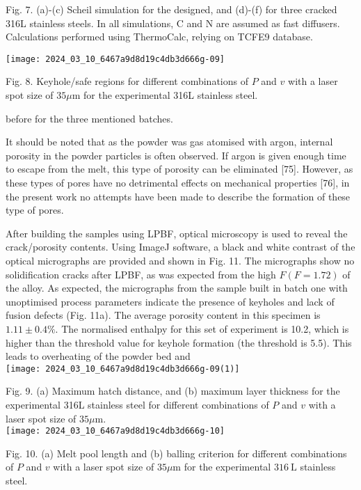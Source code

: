 \documentclass[10pt]{article}
\begin{document}
Fig. 7. (a)-(c) Scheil simulation for the designed, and (d)-(f) for three cracked 316L stainless steels. In all simulations, C and N are assumed as fast diffusers. Calculations performed using ThermoCalc, relying on TCFE9 database.

\begin{center}
\texttt{[image: 2024\_03\_10\_6467a9d8d19c4db3d666g-09]}
\end{center}

Fig. 8. Keyhole/safe regions for different combinations of $P$ and $v$ with a laser spot size of $35 \mu \mathrm{m}$ for the experimental 316L stainless steel.

before for the three mentioned batches.

It should be noted that as the powder was gas atomised with argon, internal porosity in the powder particles is often observed. If argon is given enough time to escape from the melt, this type of porosity can be eliminated [75]. However, as these types of pores have no detrimental effects on mechanical properties [76], in the present work no attempts have been made to describe the formation of these type of pores.

After building the samples using LPBF, optical microscopy is used to reveal the crack/porosity contents. Using ImageJ software, a black and white contrast of the optical micrographs are provided and shown in Fig. 11. The micrographs show no solidification cracks after LPBF, as was expected from the high $F(F=1.72)$ of the alloy. As expected, the micrographs from the sample built in batch one with unoptimised process parameters indicate the presence of keyholes and lack of fusion defects (Fig. 11a). The average porosity content in this specimen is $1.11 \pm 0.4 \%$. The normalised enthalpy for this set of experiment is 10.2, which is higher than the threshold value for keyhole formation (the threshold is 5.5). This leads to overheating of the powder bed and\\
\texttt{[image: 2024\_03\_10\_6467a9d8d19c4db3d666g-09(1)]}

Fig. 9. (a) Maximum hatch distance, and (b) maximum layer thickness for the experimental 316L stainless steel for different combinations of $P$ and $v$ with a laser spot size of $35 \mu \mathrm{m}$.\\
\texttt{[image: 2024\_03\_10\_6467a9d8d19c4db3d666g-10]}

Fig. 10. (a) Melt pool length and (b) balling criterion for different combinations of $P$ and $v$ with a laser spot size of $35 \mu \mathrm{m}$ for the experimental $316 \mathrm{~L}$ stainless steel.
\end{document}
